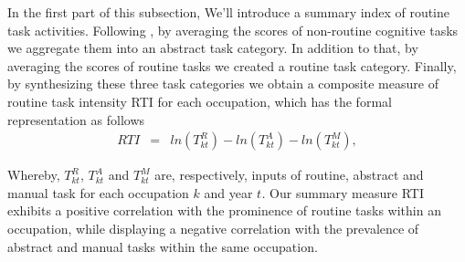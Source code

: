\begin{onehalfspace}
In the first part of this subsection, We'll introduce a summary index
of routine task activities. Following \citet{2013Autor,2006Autor},
by averaging the scores of non-routine cognitive tasks we aggregate
them into an abstract task category. In addition to that, by averaging
the scores of routine tasks we created a routine task category. Finally,
by synthesizing these three task categories we obtain a composite
measure of routine task intensity RTI for each occupation, which has
the formal representation as follows
\begin{eqnarray}
RTI & = & ln(T_{kt}^{R})-ln(T_{kt}^{A})-ln(T_{kt}^{M}),\label{eq:RTI}
\end{eqnarray}

Whereby, $T_{kt}^{R}$, $T_{kt}^{A}$ and $T_{kt}^{M}$ are, respectively,
inputs of routine, abstract and manual task for each occupation \emph{$k$}
and year \emph{$t$.} Our summary measure RTI exhibits a positive
correlation with the prominence of routine tasks within an occupation,
while displaying a negative correlation with the prevalence of abstract
and manual tasks within the same occupation.
\end{onehalfspace}
\begin{center}

\par\end{center}

\vspace{-1cm}

